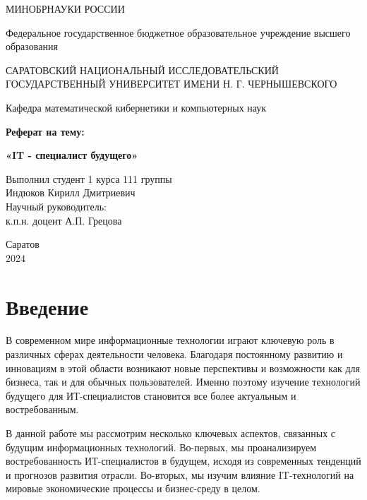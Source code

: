



\begin{titlepage}
    \centering
    {\Large МИНОБРНАУКИ РОССИИ \par}
    {\large Федеральное государственное бюджетное образовательное учреждение высшего образования\par}
    {\large САРАТОВСКИЙ НАЦИОНАЛЬНЫЙ ИССЛЕДОВАТЕЛЬСКИЙ ГОСУДАРСТВЕННЫЙ УНИВЕРСИТЕТ ИМЕНИ Н. Г. ЧЕРНЫШЕВСКОГО\par}
    \vspace{2cm}
    {\large Кафедра математической кибернетики и компьютерных наук\par}
    \vspace{3cm}
    {\LARGE \textbf{Реферат на тему:}\par}
    {\LARGE \textbf{«IT - специалист будущего»}\par}
    \vspace{3cm}
    \begin{flushright}
        Выполнил студент 1 курса 111 группы\\
        Индюков Кирилл Дмитриевич\\
        \vspace{1cm}
        Научный руководитель:\\
        к.п.н. доцент А.П. Грецова
    \end{flushright}
    \vspace{2cm}
    {\large Саратов\\2024}
\end{titlepage}

\tableofcontents
\newpage

\section*{Введение}
В современном мире информационные технологии играют ключевую роль в различных сферах деятельности человека. Благодаря постоянному развитию и инновациям в этой области возникают новые перспективы и возможности как для бизнеса, так и для обычных пользователей. Именно поэтому изучение технологий будущего для ИТ-специалистов становится все более актуальным и востребованным.

В данной работе мы рассмотрим несколько ключевых аспектов, связанных с будущим информационных технологий. Во-первых, мы проанализируем востребованность ИТ-специалистов в будущем, исходя из современных тенденций и прогнозов развития отрасли. Во-вторых, мы изучим влияние IT-технологий на мировые экономические процессы и бизнес-среду в целом.

